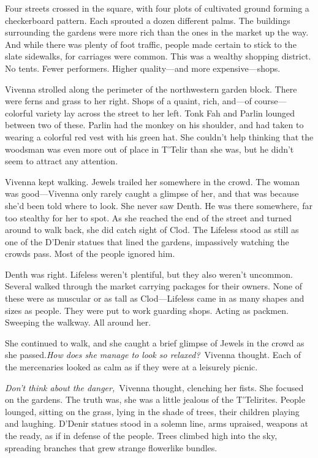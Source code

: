 Four streets crossed in the square, with four plots of cultivated ground forming a checkerboard pattern. Each sprouted a dozen different palms. The buildings surrounding the gardens were more rich than the ones in the market up the way. And while there was plenty of foot traffic, people made certain to stick to the slate sidewalks, for carriages were common. This was a wealthy shopping district. No tents. Fewer performers. Higher quality—and more expensive—shops.

Vivenna strolled along the perimeter of the northwestern garden block. There were ferns and grass to her right. Shops of a quaint, rich, and—of course—colorful variety lay across the street to her left. Tonk Fah and Parlin lounged between two of these. Parlin had the monkey on his shoulder, and had taken to wearing a colorful red vest with his green hat. She couldn’t help thinking that the woodsman was even more out of place in T’Telir than she was, but he didn’t seem to attract any attention.

Vivenna kept walking. Jewels trailed her somewhere in the crowd. The woman was good—Vivenna only rarely caught a glimpse of her, and that was because she’d been told where to look. She never saw Denth. He was there somewhere, far too stealthy for her to spot. As she reached the end of the street and turned around to walk back, she did catch sight of Clod. The Lifeless stood as still as one of the D’Denir statues that lined the gardens, impassively watching the crowds pass. Most of the people ignored him.

Denth was right. Lifeless weren’t plentiful, but they also weren’t uncommon. Several walked through the market carrying packages for their owners. None of these were as muscular or as tall as Clod—Lifeless came in as many shapes and sizes as people. They were put to work guarding shops. Acting as packmen. Sweeping the walkway. All around her.

She continued to walk, and she caught a brief glimpse of Jewels in the crowd as she passed.\textit{How does she manage to look so relaxed?}~Vivenna thought. Each of the mercenaries looked as calm as if they were at a leisurely picnic.

\textit{Don’t think about the danger,}~Vivenna thought, clenching her fists. She focused on the gardens. The truth was, she was a little jealous of the T’Telirites. People lounged, sitting on the grass, lying in the shade of trees, their children playing and laughing. D’Denir statues stood in a solemn line, arms upraised, weapons at the ready, as if in defense of the people. Trees climbed high into the sky, spreading branches that grew strange flowerlike bundles.

